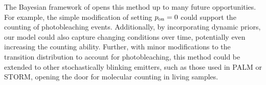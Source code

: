 The Bayesian framework of \ours opens this method up to many future 
opportunities.
    For example, the simple modification of setting $p_\text{on}=0$ could support the
    counting of photobleaching events.
    Additionally, by incorporating dynamic priors, our model could also capture
    changing conditions over time, potentially even increasing the counting
    ability.
    Further, with minor modifications to the transition distribution to account
    for photobleaching, this method could be extended to other stochastically
    blinking emitters, such as those used in PALM or STORM, opening the door
    for molecular counting in living samples.
    
